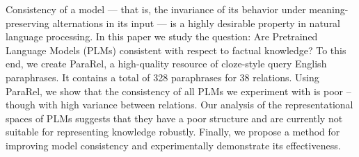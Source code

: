 Consistency of a model --- that is, the invariance of its behavior under meaning-preserving alternations in its input --- is a highly desirable property in natural language processing. In this paper we study the question: Are Pretrained Language Models (PLMs) consistent with respect to factual knowledge? To this end, we create ParaRel, a high-quality resource of cloze-style query English paraphrases. It contains a total of 328 paraphrases for 38 relations. Using ParaRel, we show that the consistency of all PLMs we experiment with is poor -- though with high variance between relations. Our analysis of the representational spaces of PLMs suggests that they have a poor structure and are currently not suitable for representing knowledge robustly. Finally, we propose a method for improving model consistency and experimentally demonstrate its effectiveness.